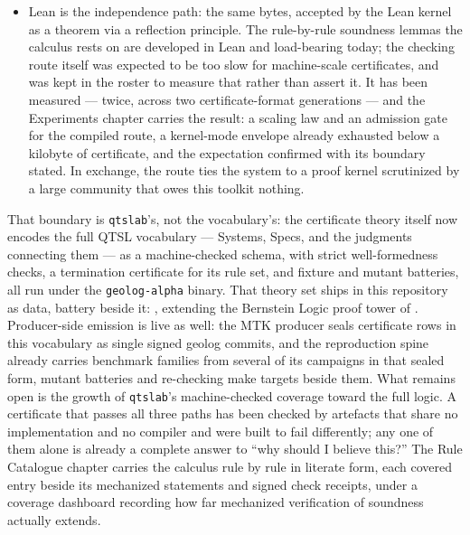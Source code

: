 \begin{itemize}
  totality over arbitrary input is part of the proof obligation, so
  malformed bytes can end only in a refusal with a witness. It is
  assembling now, along a demonstrated route: decode totality is
  proven, and the same compiler-and-theorem recipe has already
  carried a complete predecessor checker to a machine-code soundness
  theorem on real hardware. \texttt{qtslab} only checks the Bernstein
  Logic fragment of QTSL, so it never sees a probability. The
  fragment --- sequents over the certificate's own declared hypernet
  (chapter~\ref{ch:qtsl-hypernets}), certified valid under every
  admissible valuation --- is all its input format carries today, and
  the boundary fails closed: a certificate reaching beyond it is
  refused, never silently accepted.
\item Lean is the independence path: the same bytes, accepted by the
  Lean kernel as a theorem via a reflection principle. The
  rule-by-rule soundness lemmas the calculus rests on are developed
  in Lean and load-bearing today; the checking route itself was
  expected to be too slow for machine-scale certificates, and was kept
  in the roster to measure that rather than assert it. It has been
  measured --- twice, across two certificate-format generations ---
  and the Experiments chapter carries the result: a scaling law and an
  admission gate for the compiled route, a kernel-mode envelope
  already exhausted below a kilobyte of certificate, and the
  expectation confirmed with its boundary stated. In exchange, the
  route ties the system to a proof kernel scrutinized by a large
  community that owes this toolkit nothing.
\end{itemize}
That boundary is \texttt{qtslab}'s, not the vocabulary's: the
certificate theory itself now encodes the full QTSL vocabulary ---
Systems, Specs, and the judgments connecting them --- as a
machine-checked schema, with strict well-formedness checks, a
termination certificate for its rule set, and fixture and mutant
batteries, all run under the \texttt{geolog-alpha} binary. That
theory set ships in this repository as data, battery beside it:
, extending the Bernstein Logic proof
tower of . Producer-side
emission is live as well: the MTK producer seals certificate rows in
this vocabulary as single signed geolog commits, and the reproduction
spine already carries benchmark families from several of its
campaigns in that sealed form, mutant batteries and re-checking make
targets beside them. What remains open is
the growth of \texttt{qtslab}'s machine-checked coverage toward the
full logic. A certificate that
passes all three paths has been checked by artefacts that share no
implementation and no compiler and were built to fail differently; any one of them
alone is already a complete answer to ``why should I believe this?''
The Rule Catalogue chapter carries the calculus rule by rule in
literate form, each covered entry beside its mechanized statements
and signed check receipts, under a coverage dashboard recording how far
mechanized verification of soundness actually extends.

